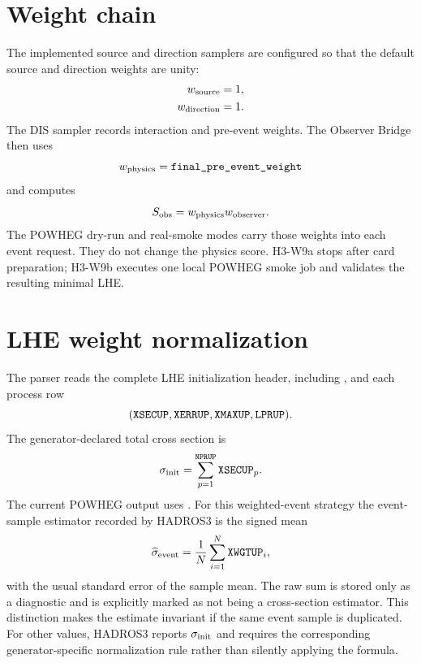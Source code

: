 \documentclass[11pt,a4paper]{report}
\numberwithin{equation}{chapter}
\newcommand{\code}[1]{\texttt{\detokenize{#1}}}
\begin{document}
\section{Weight chain}

The implemented source and direction samplers are configured so that the
default source and direction weights are unity:
\begin{align}
w_{\rm source} &= 1,\\
w_{\rm direction} &= 1.
\end{align}
The DIS sampler records interaction and pre-event weights. The Observer Bridge
then uses
\begin{equation}
w_{\rm physics}=\code{final_pre_event_weight}
\end{equation}
and computes
\begin{equation}
S_{\rm obs}=w_{\rm physics}w_{\rm observer}.
\end{equation}
The POWHEG dry-run and real-smoke modes carry those weights into each event
request. They do not change the physics score. H3-W9a stops after card
preparation; H3-W9b executes one local POWHEG smoke job and validates the
resulting minimal LHE.

\section{LHE weight normalization}

The parser reads the complete LHE initialization header, including
\code{IDWTUP}, and each process row
\begin{equation}
(\code{XSECUP},\code{XERRUP},\code{XMAXUP},\code{LPRUP}).
\end{equation}
The generator-declared total cross section is
\begin{equation}
\sigma_{\rm init}=\sum_{p=1}^{\code{NPRUP}}\code{XSECUP}_p.
\end{equation}
The current POWHEG output uses \code{IDWTUP=-4}. For this weighted-event
strategy the event-sample estimator recorded by HADROS3 is the signed mean
\begin{equation}
\widehat{\sigma}_{\rm event}
=\frac{1}{N}\sum_{i=1}^{N}\code{XWGTUP}_i,
\end{equation}
with the usual standard error of the sample mean. The raw sum is stored only as
a diagnostic and is explicitly marked as not being a cross-section estimator.
This distinction makes the estimate invariant if the same event sample is
duplicated. For other \code{IDWTUP} values, HADROS3 reports
$\sigma_{\rm init}$ and requires the corresponding generator-specific
normalization rule rather than silently applying the \code{IDWTUP=-4} formula.
\end{document}
